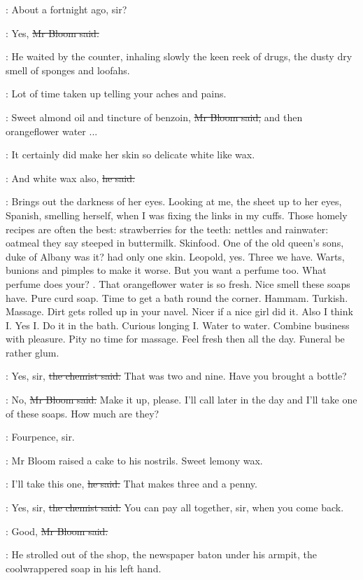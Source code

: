 \sweny:
About a fortnight ago, sir?

\Bloom:
Yes,
\sout{Mr Bloom said.}

:
He waited by the counter,
inhaling slowly the keen reek of drugs,
the dusty dry smell of sponges and loofahs.

\BloomInt:
Lot of time taken up telling your
aches and pains.

\Bloom:
Sweet almond oil and tincture of benzoin,
\sout{Mr Bloom said,}
and then orangeflower water ...

\BloomInt:
It certainly did make her skin so delicate white like wax.

\Bloom:
And white wax also,
\sout{he said.}

\BloomInt:
Brings out the darkness of her eyes.
Looking at me,
the sheet up to her eyes,
Spanish,
smelling herself,
when I was fixing the links in my cuffs.
Those homely recipes are often the best:
strawberries for the teeth:
nettles and rainwater:
oatmeal they say steeped in buttermilk.
Skinfood.
One of the old queen's sons,
duke of Albany was it?
had only one skin.
Leopold, yes.
Three we have.
Warts, bunions and pimples to make it worse.
But you want a perfume too.
What perfume does your?
.
That orangeflower water is so fresh.
Nice smell these soaps have.
Pure curd soap.
Time to get a bath round the corner.
Hammam.
Turkish.
Massage.
Dirt gets rolled up in your navel.
Nicer if a nice girl did it.
Also I think I.
Yes I.
Do it in the bath.
Curious longing I.
Water to water.
Combine business with pleasure.
Pity no time for massage.
Feel fresh then all the day.
Funeral be rather glum.

\sweny:
Yes, sir,
\sout{the chemist said.}
That was two and nine.
Have you brought a bottle?

\Bloom:
No,
\sout{Mr Bloom said.}
Make it up, please.
I'll call later in the day
and I'll take one of these soaps.
How much are they?

\sweny:
Fourpence, sir.

:
Mr Bloom raised a cake to his nostrils.
Sweet lemony wax.

\Bloom:
I'll take this one,
\sout{he said.}
That makes three and a penny.

\sweny:
Yes, sir,
\sout{the chemist said.}
You can pay all together, sir, when you come back.

\Bloom:
Good,
\sout{Mr Bloom said.}

:
He strolled out of the shop,
the newspaper baton under his armpit,
the coolwrappered soap in his left hand.

